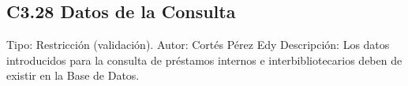 \subsection{C3.28 Datos de la Consulta }
	\UCli Tipo: Restricción (validación).
	\UCli Autor: Cortés Pérez Edy
	\UCli Descripción: Los datos introducidos para la consulta de préstamos internos e interbibliotecarios deben de existir en la Base de Datos.






